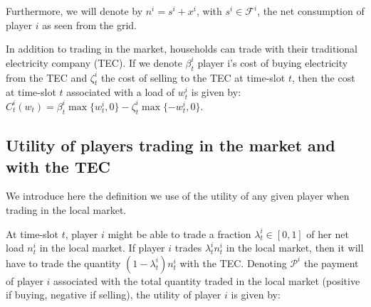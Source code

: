 \documentclass[runningheads]{llncs}
\newcommand{\li}[1][]{x^i_{#1}}
\newcommand{\oi}[1][]{n^i_{#1}}
\newcommand{\bai}[1][]{s^i_{#1}}
\newcommand{\ci}[1][]{C^i_{#1}}
\newcommand{\pbi}[1][]{\beta^i_{#1}}
\newcommand{\pzi}[1][]{\zeta^i_{#1}}
\newcommand{\fsi}{\mathcal{F}^i}
\newcommand{\mmp}[1]{[#1]^+}
\newcommand{\mmm}[1]{[#1]^-}
\newcommand{\pri}[1][]{\lambda^i_{#1}}
\newcommand{\zi}[1][]{z^i_{#1}}
\newcommand{\gaini}[1][]{\mathcal{P}^i_{#1}}
\begin{document}
Furthermore, we will denote by $\oi = \bai + \li$, with $\bai \in \fsi$, the net consumption of player $i$ as seen from the grid. 

In addition to trading in the market, households can trade with their traditional electricity company (TEC). If we denote $\pbi[t]$ player i's cost of buying electricity from the TEC and $\pzi[t]$ the cost of selling to the TEC at time-slot $t$, then the cost at time-slot $t$ associated with a load of $w^i_t$ is given by:  $\ci[t](w_t) = \pbi[t]\max\{w^i_t, 0\} - \pzi[t]\max\{- w^i_t, 0\}$.




\subsection{Utility of players trading in the market and with the TEC}

We introduce here the definition we use of the utility of any given player when trading in the local market. 

At time-slot $t$, player $i$ might be able to trade a fraction $\pri[t] \in [0, 1]$ of her net load $\oi[t]$ in the local market. If player $i$ trades $\pri[t]\oi[t]$ in the local market, then it will have to trade the quantity $(1-\pri[t])\oi[t]$ with the TEC. Denoting $\gaini$ the payment of player $i$ associated with the total quantity traded in the local market (positive if buying, negative if selling), the utility of player $i$ is given by: 
\end{document}
